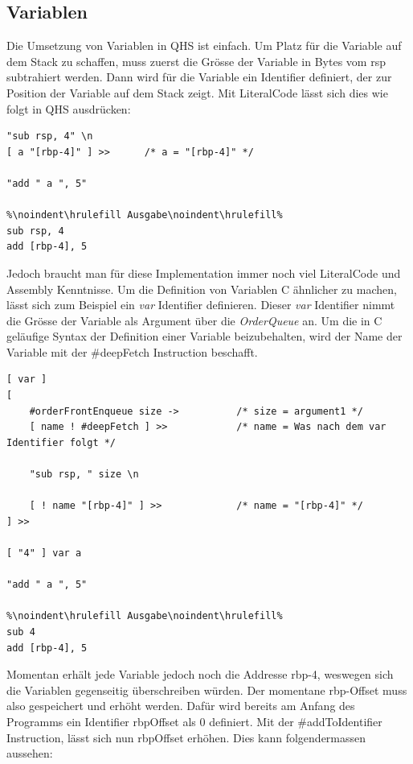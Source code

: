 \subsection{Variablen} \label{sec:qhs-vars}
Die Umsetzung von Variablen in QHS ist einfach.
Um Platz für die Variable auf dem Stack zu schaffen, muss zuerst die Grösse der Variable in Bytes vom rsp subtrahiert werden.
Dann wird für die Variable ein Identifier definiert, der zur Position der Variable auf dem Stack zeigt.
Mit LiteralCode lässt sich dies wie folgt in QHS ausdrücken:

\begin{lstlisting}[language=QHS, caption=Definition einer Variable mit LiteralCode]
"sub rsp, 4" \n
[ a "[rbp-4]" ] >>      /* a = "[rbp-4]" */

"add " a ", 5"

%\noindent\hrulefill Ausgabe\noindent\hrulefill%
sub rsp, 4
add [rbp-4], 5
\end{lstlisting}

Jedoch braucht man für diese Implementation immer noch viel LiteralCode und Assembly Kenntnisse. Um die Definition von Variablen C ähnlicher zu machen, lässt sich zum Beispiel ein \textit{var} Identifier definieren.
Dieser \textit{var} Identifier nimmt die Grösse der Variable als Argument über die \textit{OrderQueue} an. Um die in C geläufige Syntax der Definition einer Variable beizubehalten,
wird der Name der Variable mit der \#deepFetch Instruction beschafft.

\begin{lstlisting}[language=QHS, caption=Definition einer Variable mit \textit{var} Identifier]
[ var ]
[
    #orderFrontEnqueue size ->          /* size = argument1 */
    [ name ! #deepFetch ] >>            /* name = Was nach dem var Identifier folgt */

    "sub rsp, " size \n

    [ ! name "[rbp-4]" ] >>             /* name = "[rbp-4]" */
] >> 

[ "4" ] var a 

"add " a ", 5"
    
%\noindent\hrulefill Ausgabe\noindent\hrulefill%
sub 4
add [rbp-4], 5
\end{lstlisting}

Momentan erhält jede Variable jedoch noch die Addresse rbp-4, weswegen sich die Variablen gegenseitig überschreiben würden. Der momentane rbp-Offset muss also gespeichert und erhöht werden.
Dafür wird bereits am Anfang des Programms ein Identifier rbpOffset als 0 definiert. Mit der \#addToIdentifier Instruction, lässt sich nun rbpOffset erhöhen. Dies kann folgendermassen aussehen:

